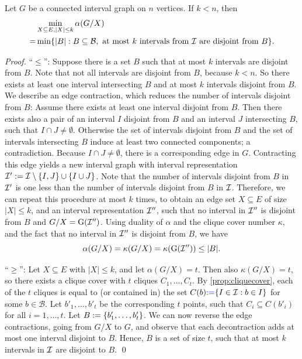 \begin{lemma}
\label{lemma:contraction}
Let $G$ be a connected interval graph on $n$ vertices. If $k < n$, then
\begin{align*}
&\min_{X \subseteq E, |X| \leq k}\alpha(G/X) \\
= &\min\{ |B| : B \subseteq \mathcal{B}, \text{ at most $k$ intervals from $\mathcal{I}$ are disjoint from $B$} \}.
\end{align*} 
\end{lemma}
\begin{proof}
\enquote{$\leq$}: Suppose there is a set $B$ such that at most $k$ intervals are disjoint from $B$. Note that not all intervals are disjoint from $B$, because $k < n$. So there exists at least one interval intersecting $B$ and at most $k$ intervals disjoint from $B$. We describe an edge contraction, which reduces the number of intervals disjoint from $B$: Assume there exists at least one interval disjoint from $B$. Then there exists also a pair of an interval $I$ disjoint from $B$ and an interval $J$ intersecting $B$, such that $I \cap J \neq \emptyset$. Otherwise the set of  intervals disjoint from $B$ and the set of intervals intersecting $B$ induce at least two connected components; a contradiction. Because $I \cap J \neq \emptyset$, there is a corresponding edge in $G$. Contracting this edge yields a new interval graph with interval representation $\mathcal{I}' := \mathcal{I} \setminus \{ I, J \} \cup \{ I \cup J \}$. Note that the number of intervals disjoint from $B$ in $\mathcal{I}'$ is one less than the number of intervals disjoint from $B$ in $\mathcal{I}$. Therefore, we can repeat this procedure at most $k$ times, to obtain an edge set $X \subseteq E$ of size $|X| \leq k$, and an interval representation $\mathcal{I}''$, such that no interval in $\mathcal{I}''$ is disjoint from $B$ and $G/X = \operatorname{G}(\mathcal{I}'')$. Using duality of $\alpha$ and the clique cover number $\kappa$, and the fact that no interval in $\mathcal{I}''$ is disjoint from $B$, we have
\[\alpha(G/X) = \kappa(G/X) = \kappa(\operatorname{G}(\mathcal{I}'')) \leq |B|.  \]

\enquote{$\geq$}: Let $X \subseteq E$ with $|X| \leq k$, and let $\alpha(G/X) = t$. Then also $\kappa(G/X) = t$, so there exists a clique cover with $t$ cliques $C_1, \dots, C_t$. By \cref{prop:cliquecover}, each of the $t$ cliques is equal to (or contained in) the set $C(b)  \textcolor{blue}{ := } \{ I \in \mathcal{I} : b \in I \}$ for some $b \in \mathcal{B}$. Let $b'_1, \dots, b'_t$ be the corresponding $t$ points, such that $C_i \subseteq C(b'_i)$ for all $i = 1,\dots,t$. Let $B := \{ b'_1, \ldots, b'_t \}$. We can now reverse the edge contractions, going from $G/X$ to $G$, and observe that each decontraction adds at most one interval disjoint to $B$. Hence, $B$ is a set of size $t$, such that at most $k$ intervals in $\mathcal{I}$ are disjoint to $B$. \qed
\end{proof}

